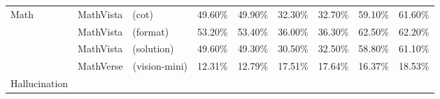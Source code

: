\begin{table}[t!]
{\begin{tabular}{p{1.5cm}p{3cm}p{1.5cm}p{1.6cm}p{1.5cm}p{1.6cm}p{1.5cm}p{1.6cm}}
\cmidrule{2-8}
     \multirow{4}{*}{Math}
    & MathVista~\cite{lu2024mathvista}~\tiny{(cot)} \newline \tiny{\color{light-gray}{General Math Understanding}} & 49.60\tiny{\%} & \cellcolor{front-color} 49.90\tiny{\%} \tiny{\color{brown}{+0.30\%}} & 32.30\tiny{\%} & \cellcolor{front-color} 32.70\tiny{\%} \tiny{\color{brown}{+0.40\%}} & 59.10\tiny{\%} & \cellcolor{front-color} 61.60\tiny{\%} \tiny{\color{brown}{+2.50\%}} \\
    & MathVista~\cite{lu2024mathvista}~\tiny{(format)} \newline \tiny{\color{light-gray}{General Math Understanding}} & 53.20\tiny{\%} & \cellcolor{front-color} 53.40\tiny{\%} \tiny{\color{brown}{+0.20\%}} & 36.00\tiny{\%} & \cellcolor{front-color} 36.30\tiny{\%} \tiny{\color{brown}{+0.30\%}} & 62.50\tiny{\%} & \cellcolor{front-color} 62.20\tiny{\%} \tiny{\color{gray}{-0.30\%}} \\
    & MathVista~\cite{lu2024mathvista}~\tiny{(solution)} \newline \tiny{\color{light-gray}{General Math Understanding}} & 49.60\tiny{\%} & \cellcolor{front-color} 49.30\tiny{\%} \tiny{\color{gray}{-0.30\%}} & 30.50\tiny{\%} & \cellcolor{front-color} 32.50\tiny{\%} \tiny{\color{brown}{+2.00\%}} & 58.80\tiny{\%} & \cellcolor{front-color} 61.10\tiny{\%} \tiny{\color{brown}{+2.30\%}} \\
    & MathVerse~\cite{zhang2024mathverse}~\tiny{(vision-mini)} \newline \tiny{\color{light-gray}{Professional Math Reasoning}} & 12.31\tiny{\%} & \cellcolor{front-color} 12.79\tiny{\%} \tiny{\color{brown}{+0.48\%}} & 17.51\tiny{\%} & \cellcolor{front-color} 17.64\tiny{\%} \tiny{\color{brown}{+0.13\%}} & 16.37\tiny{\%} & \cellcolor{front-color} 18.53\tiny{\%} \tiny{\color{brown}{+2.16\%}} \\
\cmidrule{2-8}
     \multirow{7}{*}{\parbox{1.5cm}{Hallucination}} 
  

\end{tabular}}
\end{table}
